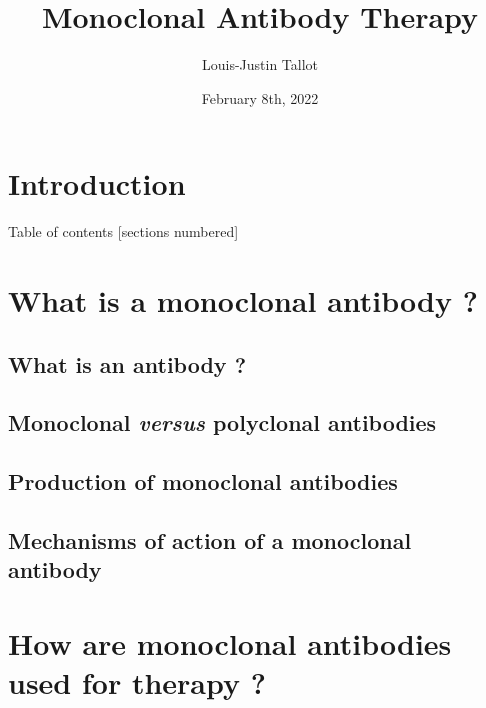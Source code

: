 \documentclass{beamer}
\title{
  \textbf{Monoclonal Antibody Therapy}
}
\author{Louis-Justin Tallot}
\date{February 8th, 2022}
\begin{document}
  \maketitle





  \section*{Introduction}
  

  \begin{frame}{Table of contents}
    [sections numbered]
    \tableofcontents
  \end{frame}

  \section{What is a monoclonal antibody ?}

    \subsection{What is an antibody ?}
    

    \subsection{Monoclonal \textit{versus} polyclonal antibodies}
    

    \subsection{Production of monoclonal antibodies}
    

    \subsection{Mechanisms of action of a monoclonal antibody}
    

  \section{How are monoclonal antibodies used for therapy ?}

\end{document}

